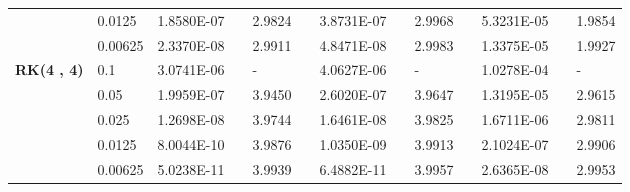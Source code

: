 \begin{table}[H]
\begin{tabular}{lllllrlrlrlrlrl}
\multicolumn{2}{l}{} & \multicolumn{2}{l}{0.0125} & 1.8580E-07 &       & 2.9824  &       & 3.8731E-07 &       & 2.9968  &       & 5.3231E-05 &       & 1.9854  \\
\multicolumn{2}{l}{} & \multicolumn{2}{l}{0.00625} & 2.3370E-08 &       & 2.9911  &       & 4.8471E-08 &       & 2.9983  &       & 1.3375E-05 &       & 1.9927  \\
\multicolumn{2}{l}{\multirow{5}[1]{*}{\textbf{RK(4 , 4)}}} & \multicolumn{2}{l}{0.1} & 3.0741E-06 &       &-    &       & 4.0627E-06 &       &-    &       & 1.0278E-04 &       &-\\
\multicolumn{2}{l}{} & \multicolumn{2}{l}{0.05} & 1.9959E-07 &       & 3.9450  &       & 2.6020E-07 &       & 3.9647  &       & 1.3195E-05 &       & 2.9615  \\
\multicolumn{2}{l}{} & \multicolumn{2}{l}{0.025} & 1.2698E-08 &       & 3.9744  &       & 1.6461E-08 &       & 3.9825  &       & 1.6711E-06 &       & 2.9811  \\
\multicolumn{2}{l}{} & \multicolumn{2}{l}{0.0125} & 8.0044E-10 &       & 3.9876  &       & 1.0350E-09 &       & 3.9913  &       & 2.1024E-07 &       & 2.9906  \\
\multicolumn{2}{l}{} & \multicolumn{2}{l}{0.00625} & 5.0238E-11 &       & 3.9939  &       & 6.4882E-11 &       & 3.9957  &       & 2.6365E-08 &       & 2.9953  \\
\bottomrule
\end{tabular}%
\label{tab_SAVRRK:6-4}%
\end{table}%
\vspace{-8mm}
